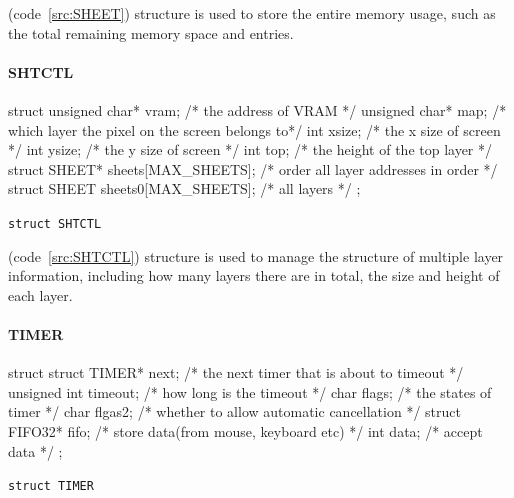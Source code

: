 \documentclass{swfcthesis}
\begin{document}
(code~\ref{src:SHEET}) structure is used to store the entire memory usage, such as the
total remaining memory space and entries.



\paragraph{SHTCTL}

\begin{listing}[H]
  \begin{codeblock}
\begin{ccode}
struct 
{ 
  unsigned char* vram;              /* the address of VRAM */
  unsigned char* map;               /* which layer the pixel on the screen belongs to*/
  int xsize;                        /* the x size of screen */
  int ysize;                        /* the y size of screen */
  int top;                          /* the height of the top layer */
  struct SHEET* sheets[MAX_SHEETS]; /* order all layer addresses in order */
  struct SHEET sheets0[MAX_SHEETS]; /* all layers */
};
\end{ccode}
  \end{codeblock}
  \caption{\texttt{struct SHTCTL}}\label{src:SHTCTL}
\end{listing}

(code~\ref{src:SHTCTL}) structure is used to manage the structure of multiple layer information,
including how many layers there are in total, the size and height of each layer.



\paragraph{TIMER}

\begin{listing}[H]
  \begin{codeblock}
\begin{ccode}
struct 
{ 
  struct TIMER* next;   /* the next timer that is about to timeout */
  unsigned int timeout; /* how long is the timeout */
  char flags;           /* the states of timer */
  char flgas2;          /* whether to allow automatic cancellation */
  struct FIFO32* fifo;  /* store data(from mouse, keyboard etc) */
  int data;             /* accept data */
};
\end{ccode}
  \end{codeblock}
  \caption{\texttt{struct TIMER}}\label{src:TIMER}
\end{listing}
\end{document}
